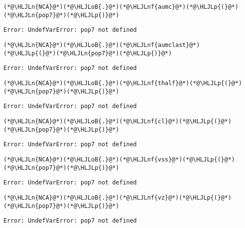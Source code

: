 \documentclass[12pt,a4paper]{article}
\newcommand{\HLJLn}[1]{#1}
\newcommand{\HLJLnf}[1]{\textcolor[RGB]{66,102,213}{#1}}
\newcommand{\HLJLoB}[1]{\textcolor[RGB]{102,102,102}{\textbf{#1}}}
\newcommand{\HLJLp}[1]{#1}
\begin{document}
\begin{lstlisting}
(*@\HLJLn{NCA}@*)(*@\HLJLoB{.}@*)(*@\HLJLnf{aumc}@*)(*@\HLJLp{(}@*)(*@\HLJLn{pop7}@*)(*@\HLJLp{)}@*)
\end{lstlisting}

\begin{lstlisting}
Error: UndefVarError: pop7 not defined
\end{lstlisting}


\begin{lstlisting}
(*@\HLJLn{NCA}@*)(*@\HLJLoB{.}@*)(*@\HLJLnf{aumclast}@*)(*@\HLJLp{(}@*)(*@\HLJLn{pop7}@*)(*@\HLJLp{)}@*)
\end{lstlisting}

\begin{lstlisting}
Error: UndefVarError: pop7 not defined
\end{lstlisting}


\begin{lstlisting}
(*@\HLJLn{NCA}@*)(*@\HLJLoB{.}@*)(*@\HLJLnf{thalf}@*)(*@\HLJLp{(}@*)(*@\HLJLn{pop7}@*)(*@\HLJLp{)}@*)
\end{lstlisting}

\begin{lstlisting}
Error: UndefVarError: pop7 not defined
\end{lstlisting}


\begin{lstlisting}
(*@\HLJLn{NCA}@*)(*@\HLJLoB{.}@*)(*@\HLJLnf{cl}@*)(*@\HLJLp{(}@*)(*@\HLJLn{pop7}@*)(*@\HLJLp{)}@*)
\end{lstlisting}

\begin{lstlisting}
Error: UndefVarError: pop7 not defined
\end{lstlisting}


\begin{lstlisting}
(*@\HLJLn{NCA}@*)(*@\HLJLoB{.}@*)(*@\HLJLnf{vss}@*)(*@\HLJLp{(}@*)(*@\HLJLn{pop7}@*)(*@\HLJLp{)}@*)
\end{lstlisting}

\begin{lstlisting}
Error: UndefVarError: pop7 not defined
\end{lstlisting}


\begin{lstlisting}
(*@\HLJLn{NCA}@*)(*@\HLJLoB{.}@*)(*@\HLJLnf{vz}@*)(*@\HLJLp{(}@*)(*@\HLJLn{pop7}@*)(*@\HLJLp{)}@*)
\end{lstlisting}

\begin{lstlisting}
Error: UndefVarError: pop7 not defined
\end{lstlisting}
\end{document}
